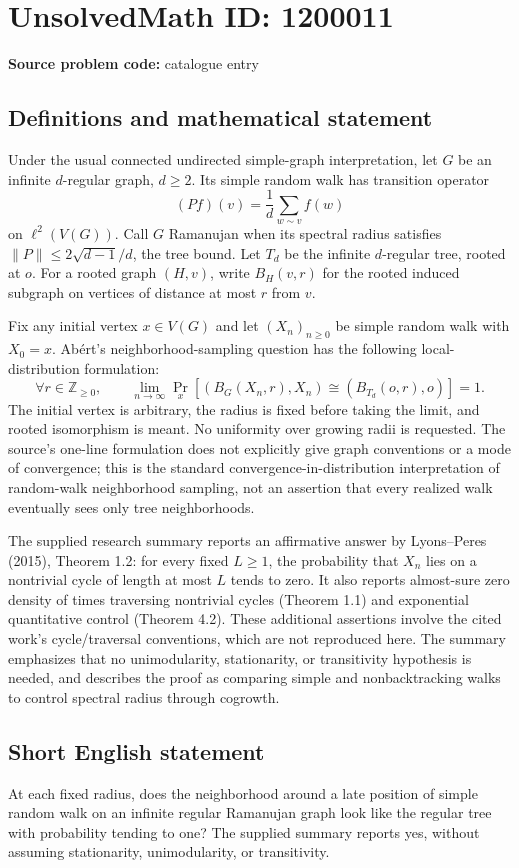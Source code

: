 \documentclass[11pt]{article}
\newcommand{\Z}{\mathbb{Z}}
\begin{document}
\section*{UnsolvedMath ID: 1200011}
\textbf{Source problem code:} catalogue entry
\subsection{Definitions and mathematical statement}
Under the usual connected undirected simple-graph interpretation, let $G$ be an infinite $d$-regular graph, $d\geq2$. Its simple random walk has transition operator
\[
(Pf)(v)=\frac1d\sum_{w\sim v}f(w)
\]
on $\ell^2(V(G))$. Call $G$ Ramanujan when its spectral radius satisfies $\|P\|\leq2\sqrt{d-1}/d$, the tree bound. Let $T_d$ be the infinite $d$-regular tree, rooted at $o$. For a rooted graph $(H,v)$, write $B_H(v,r)$ for the rooted induced subgraph on vertices of distance at most $r$ from $v$.

Fix any initial vertex $x\in V(G)$ and let $(X_n)_{n\geq0}$ be simple random walk with $X_0=x$. Ab\'ert's neighborhood-sampling question has the following local-distribution formulation:
\[
\forall r\in\Z_{\geq0},\qquad
\lim_{n\to\infty}\Pr_x\!\left[
(B_G(X_n,r),X_n)\cong(B_{T_d}(o,r),o)
\right]=1.
\]
The initial vertex is arbitrary, the radius is fixed before taking the limit, and rooted isomorphism is meant. No uniformity over growing radii is requested. The source's one-line formulation does not explicitly give graph conventions or a mode of convergence; this is the standard convergence-in-distribution interpretation of random-walk neighborhood sampling, not an assertion that every realized walk eventually sees only tree neighborhoods.

The supplied research summary reports an affirmative answer by Lyons--Peres (2015), Theorem 1.2: for every fixed $L\geq1$, the probability that $X_n$ lies on a nontrivial cycle of length at most $L$ tends to zero. It also reports almost-sure zero density of times traversing nontrivial cycles (Theorem 1.1) and exponential quantitative control (Theorem 4.2). These additional assertions involve the cited work's cycle/traversal conventions, which are not reproduced here. The summary emphasizes that no unimodularity, stationarity, or transitivity hypothesis is needed, and describes the proof as comparing simple and nonbacktracking walks to control spectral radius through cogrowth.
\subsection{Short English statement}
At each fixed radius, does the neighborhood around a late position of simple random walk on an infinite regular Ramanujan graph look like the regular tree with probability tending to one? The supplied summary reports yes, without assuming stationarity, unimodularity, or transitivity.
\end{document}
